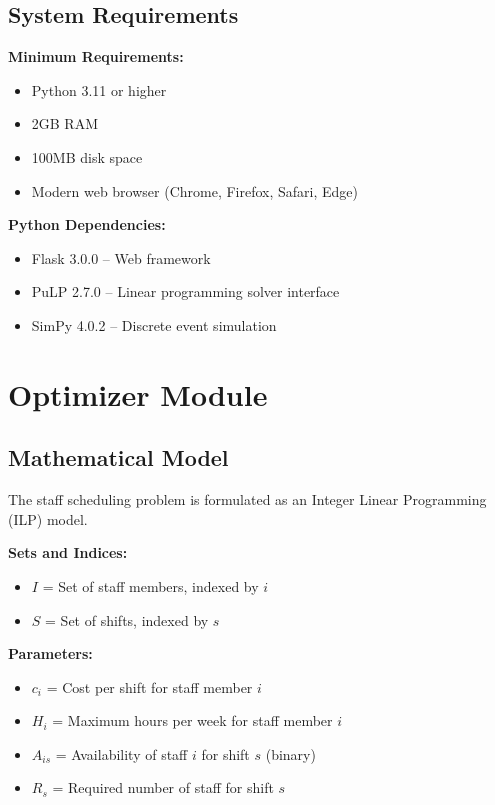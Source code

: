 \documentclass[12pt,a4paper]{article}
\begin{document}
\subsection{System Requirements}

\textbf{Minimum Requirements:}
\begin{itemize}
    \item Python 3.11 or higher
    \item 2GB RAM
    \item 100MB disk space
    \item Modern web browser (Chrome, Firefox, Safari, Edge)
\end{itemize}

\textbf{Python Dependencies:}
\begin{itemize}
    \item Flask 3.0.0 -- Web framework
    \item PuLP 2.7.0 -- Linear programming solver interface
    \item SimPy 4.0.2 -- Discrete event simulation
\end{itemize}

\newpage

\section{Optimizer Module}
\label{sec:optimizer}

\subsection{Mathematical Model}
\label{subsec:math-model}

The staff scheduling problem is formulated as an Integer Linear Programming (ILP) model.

\vspace{0.5em}
\noindent\textbf{Sets and Indices:}
\begin{itemize}[topsep=4pt]
    \item $I$ = Set of staff members, indexed by $i$
    \item $S$ = Set of shifts, indexed by $s$
\end{itemize}

\vspace{0.3em}
\noindent\textbf{Parameters:}
\begin{itemize}[topsep=4pt]
    \item $c_i$ = Cost per shift for staff member $i$
    \item $H_i$ = Maximum hours per week for staff member $i$
    \item $A_{is}$ = Availability of staff $i$ for shift $s$ (binary)
    \item $R_s$ = Required number of staff for shift $s$
\end{itemize}
\end{document}
